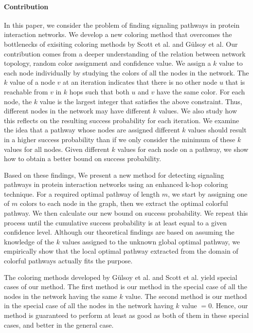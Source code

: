 \documentclass{ws-procs11x85}
\begin{document}
\paragraph{Contribution} In this paper, we consider the problem of finding
signaling pathways in protein interaction networks. We develop a new coloring
method that overcomes the bottlenecks of exisiting coloring methods by Scott et
al.\cite{scott} and G{\"u}lsoy et al\cite{gulsoy}. Our contribution comes from a
deeper understanding of the relation between network topology, random color
assignment and confidence value. We assign a $k$ value to each node
individually by studying the colors of all the nodes in the network. The $k$
value of a node $v$ at an iteration indicates that there is no other node $u$
that is reachable from $v$ in $k$ hops such that both $u$ and $v$ have the same
color. For each node, the $k$ value is the largest integer that satisfies the
above constraint. Thus, different nodes in the network may have different $k$
values. We also study how this reflects on the resulting success probability for
each iteration. We examine the idea that a pathway whose nodes are assigned
different $k$ values should result in a higher success probability than if we
only consider the minimum of these $k$ values for all nodes. Given different
$k$ values for each node on a pathway, we show how to obtain a better bound on
success probability.

Based on these findings, We present a new method for detecting signaling
pathways in protein interaction networks using an enhanced k-hop coloring
technique. For a required optimal pathway of length $m$, we start by assigning
one of $m$ colors to each node in the graph, then we extract the optimal
colorful pathway. We then calculate our new bound on success probability. We
repeat this process until the cumulative success probability is at least equal
to a given confidence level. Although our theoretical findings are based on
assuming the knowledge of the $k$ values assigned to the unknown global optimal
pathway, we empirically show that the local optimal pathway extracted from the
domain of colorful pathways actually fits the purpose.

The coloring methods developed by G{\"u}lsoy et al.\cite{gulsoy} and Scott et
al.\cite{scott} yield special cases of our method. The first method is our
method in the special case of all the nodes in the network having the same $k$
value. The second method is our method in the special case of all the nodes in
the network having $k$ value $= 0$. Hence, our method is guaranteed to perform
at least as good as both of them in these special cases, and better in the
general case.
\end{document}
